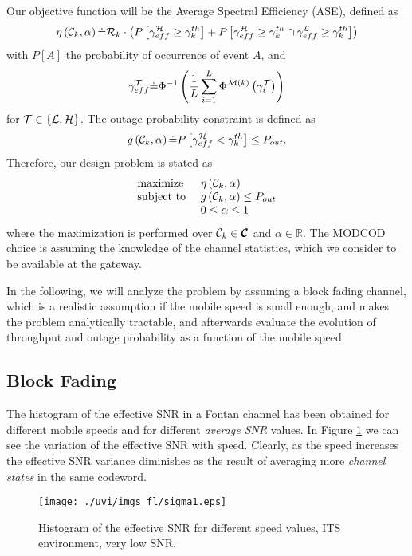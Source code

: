 \documentclass[journal,onecolumn,10pt,a4paper]{IEEEtran}
\newcommand{\field}[1]{\mathbb{#1}}
\begin{document}
Our objective function will be the Average Spectral Efficiency (ASE), defined as
\begin{equation}
\eta\left({\cal C}_k, \alpha \right) \dot= 
{\cal R}_k\cdot\left( P\left[ \gamma_{eff}^{{\cal H}} \geq \gamma_k^{th} \right] + P\left[ \gamma_{eff}^{{\cal H}} \geq \gamma_k^{th} \cap \gamma_{eff}^{{\cal L}} \geq \gamma_k^{th}\right] \right)
\end{equation}
with $P\left[ A \right]$ the probability of occurrence of event $A$, and
\begin{equation}
 \gamma_{eff}^{{\cal T}} \dot = \Phi^{-1}\left(\frac{1}{L}\sum_{i=1}	^{L} \Phi^{{\cal M}(k)}\left( \gamma_i^{{\cal T}}\right)\right)
\end{equation}
for ${\cal T} \in \left\{ {\cal L}, {\cal H}\right\}$. The outage probability constraint is defined as
\begin{equation}
 g\left({\cal C}_k, \alpha \right) \dot = P\left[ \gamma_{eff}^{\cal H} < \gamma_k^{th} \right] \leq P_{out}.
\end{equation}
Therefore, our design problem is stated as
\begin{equation}
\label{e:optProb}
  \begin{array}{ll}
  \mbox{maximize } & \eta\left({\cal C}_k, \alpha \right) \\
  \mbox{subject to } & g\left({\cal C}_k, \alpha \right) \leq P_{out} \\
		     & 0 \leq \alpha \leq 1
\end{array}		
\end{equation}
where the maximization is performed over ${\cal C}_k \in \boldsymbol{\mathbf{\cal C}}$ and $\alpha \in {\field R}$. The MODCOD choice is assuming the knowledge of the channel statistics, which we consider to be available at the gateway.

In the following, we will analyze the problem  by assuming a block fading channel, which is a realistic assumption if the mobile speed is small enough, and makes the problem analytically tractable, and afterwards evaluate the evolution of throughput and outage probability as a function of the mobile speed.

\subsection{Block Fading}
The histogram of the effective SNR in a Fontan channel has been obtained for different mobile speeds and for different \textit{average SNR} values. 
In Figure \ref{s1} we can see the variation of the effective SNR with speed. Clearly, as the speed increases the effective SNR variance diminishes as the result of averaging more \textit{channel states} in the same codeword.
\begin{figure}
\begin{center}
 \texttt{[image: ./uvi/imgs\_fl/sigma1.eps]}
\caption{Histogram of the effective SNR for different speed values, ITS environment, very low SNR. }
\label{s1}
\end{center}\end{figure}
\end{document}
